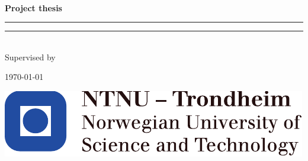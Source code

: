 \begin{titlepage}

\begin{center}
    
    ~\\[2.0cm]
    
    \Large \textbf{Project thesis}\\[2.5cm]
     
    \hrule
    {\LARGE \mytitle}	%
    \vspace{0.5cm}
    \hrule
    
    \vspace{1.0cm}
    
    \LARGE \textbf{\myauthor}\\[2.5cm]
    
    \Large Supervised by\par
	\textbf{\mysupervisor}
    
    \vfill
    {\large \today}
    
    \vspace{1.0cm}
    
    \includegraphics{images/ntnu_logo.pdf}
    
\end{center}


\end{titlepage}